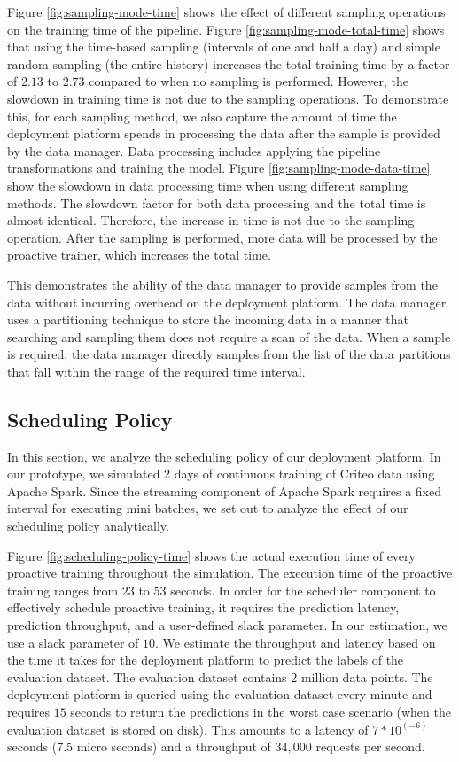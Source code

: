 Figure \ref{fig:sampling-mode-time} shows the effect of different sampling operations on the training time of the pipeline.
Figure \ref{fig:sampling-mode-total-time} shows that using the time-based sampling (intervals of one and half a day) and simple random sampling (the entire history) increases the total training time by a factor of $2.13$ to $2.73$ compared to when no sampling is performed.
However, the slowdown in training time is not due to the sampling operations.
To demonstrate this, for each sampling method, we also capture the amount of time the deployment platform spends in processing the data after the sample is provided by the data manager.
Data processing includes applying the pipeline transformations and training the model.
Figure \ref{fig:sampling-mode-data-time} show the slowdown in data processing time when using different sampling methods.
The slowdown factor for both data processing and the total time is almost identical.
Therefore, the increase in time is not due to the sampling operation.
After the sampling is performed, more data will be processed by the proactive trainer, which increases the total time.

This demonstrates the ability of the data manager to provide samples from the data without incurring overhead on the deployment platform.
The data manager uses a partitioning technique to store the incoming data in a manner that searching and sampling them does not require a scan of the data.
When a sample is required, the data manager directly samples from the list of the data partitions that fall within the range of the required time interval.

\subsection{Scheduling Policy}
In this section, we analyze the scheduling policy of our deployment platform.
In our prototype, we simulated 2 days of continuous training of Criteo data using Apache Spark.
Since the streaming component of Apache Spark requires a fixed interval for executing mini batches, we set out to analyze the effect of our scheduling policy analytically.

Figure \ref{fig:scheduling-policy-time} shows the actual execution time of every proactive training throughout the simulation.
The execution time of the proactive training ranges from $23$ to $53$ seconds.
In order for the scheduler component to effectively schedule proactive training, it requires the prediction latency, prediction throughput, and a user-defined slack parameter.
In our estimation, we use a slack parameter of $10$.
We estimate the throughput and latency based on the time it takes for the deployment platform to predict the labels of the evaluation dataset.
The evaluation dataset contains 2 million data points.
The deployment platform is queried using the evaluation dataset every minute and requires $15$ seconds to return the predictions in the worst case scenario (when the evaluation dataset is stored on disk). 
This amounts to a latency of $7 * 10 ^ {(-6)}$ seconds (7.5 micro seconds) and a throughput of $34,000$ requests per second.

